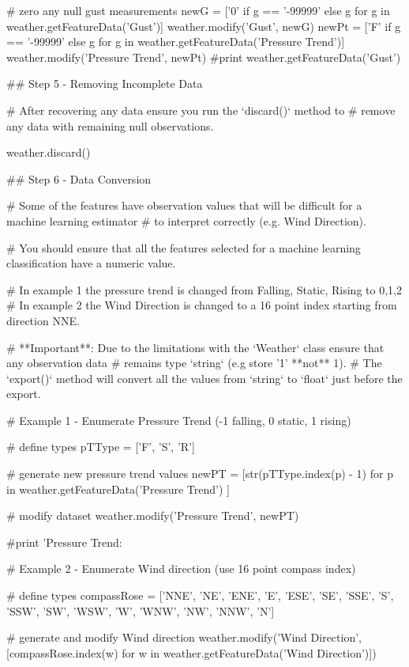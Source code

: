 \documentclass[12pt]{article}
\begin{document}
\begin{python}
# zero any null gust measurements
newG = ['0' if g == '-99999' else g for g in weather.getFeatureData('Gust')]
weather.modify('Gust', newG)
newPt = ['F' if g == '-99999' else g for g in weather.getFeatureData('Pressure Trend')]
weather.modify('Pressure Trend', newPt)
#print weather.getFeatureData('Gust')

## Step 5 - Removing Incomplete Data

# After recovering any data ensure you run the `discard()` method to
# remove any data with remaining null observations.

weather.discard()

## Step 6 - Data Conversion

# Some of the features have observation values that will be difficult for a machine learning estimator
# to interpret correctly (e.g. Wind Direction).

# You should ensure that all the features selected for a machine learning classification have a numeric value.

# In example 1 the pressure trend is changed from Falling, Static, Rising to 0,1,2
# In example 2 the Wind Direction is changed to a 16 point index starting from direction NNE.

# **Important**: Due to the limitations with the `Weather` class ensure that any observation data
# remains type `string` (e.g store '1' **not** 1).
# The `export()` method will convert all the values from `string` to `float` just before the export.

# Example 1 - Enumerate Pressure Trend (-1 falling, 0 static, 1 rising)

# define types
pTType = ['F', 'S', 'R']

# generate new pressure trend values
newPT = [str(pTType.index(p) - 1) for p in weather.getFeatureData('Pressure Trend') ]

# modify dataset
weather.modify('Pressure Trend', newPT)

#print 'Pressure Trend: %

# Example 2 - Enumerate Wind direction (use 16 point compass index)

# define types
compassRose = ['NNE', 'NE', 'ENE', 'E', 'ESE', 'SE', 'SSE', 'S', 'SSW', 'SW', 'WSW', 'W', 'WNW', 'NW', 'NNW', 'N']

# generate and modify Wind direction
weather.modify('Wind Direction', [compassRose.index(w) for w in weather.getFeatureData('Wind Direction')])


\end{python}
\end{document}
